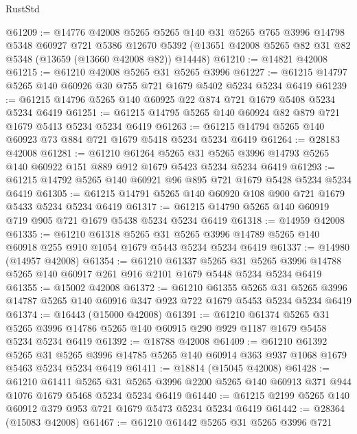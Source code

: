 \begin{lexlean}{RustStd}
\begin{coremodule}
@61209 := @14776
    @42008
    @5265
    @5265
    @140
    @31
    @5265
    @765
    @3996
    @14798
    @5348
    @60927
    @721
    @5386
    @12670
    @5392
    (@13651 @42008 @5265 @82 @31 @82 @5348 (@13659 (@13660 @42008 @82)) @14448)
@61210 := @14821 @42008
@61215 := @61210 @42008 @5265 @31 @5265 @3996
@61227 := @61215 @14797 @5265 @140 @60926 @30 @755 @721 @1679 @5402 @5234 @5234 @6419
@61239 := @61215 @14796 @5265 @140 @60925 @22 @874 @721 @1679 @5408 @5234 @5234 @6419
@61251 := @61215 @14795 @5265 @140 @60924 @82 @879 @721 @1679 @5413 @5234 @5234 @6419
@61263 := @61215 @14794 @5265 @140 @60923 @73 @884 @721 @1679 @5418 @5234 @5234 @6419
@61264 := @28183 @42008
@61281 := @61210
    @61264
    @5265
    @31
    @5265
    @3996
    @14793
    @5265
    @140
    @60922
    @151
    @889
    @912
    @1679
    @5423
    @5234
    @5234
    @6419
@61293 := @61215 @14792 @5265 @140 @60921 @96 @895 @721 @1679 @5428 @5234 @5234 @6419
@61305 := @61215 @14791 @5265 @140 @60920 @108 @900 @721 @1679 @5433 @5234 @5234 @6419
@61317 := @61215 @14790 @5265 @140 @60919 @719 @905 @721 @1679 @5438 @5234 @5234 @6419
@61318 := @14959 @42008
@61335 := @61210
    @61318
    @5265
    @31
    @5265
    @3996
    @14789
    @5265
    @140
    @60918
    @255
    @910
    @1054
    @1679
    @5443
    @5234
    @5234
    @6419
@61337 := @14980 (@14957 @42008)
@61354 := @61210
    @61337
    @5265
    @31
    @5265
    @3996
    @14788
    @5265
    @140
    @60917
    @261
    @916
    @2101
    @1679
    @5448
    @5234
    @5234
    @6419
@61355 := @15002 @42008
@61372 := @61210
    @61355
    @5265
    @31
    @5265
    @3996
    @14787
    @5265
    @140
    @60916
    @347
    @923
    @722
    @1679
    @5453
    @5234
    @5234
    @6419
@61374 := @16443 (@15000 @42008)
@61391 := @61210
    @61374
    @5265
    @31
    @5265
    @3996
    @14786
    @5265
    @140
    @60915
    @290
    @929
    @1187
    @1679
    @5458
    @5234
    @5234
    @6419
@61392 := @18788 @42008
@61409 := @61210
    @61392
    @5265
    @31
    @5265
    @3996
    @14785
    @5265
    @140
    @60914
    @363
    @937
    @1068
    @1679
    @5463
    @5234
    @5234
    @6419
@61411 := @18814 (@15045 @42008)
@61428 := @61210
    @61411
    @5265
    @31
    @5265
    @3996
    @2200
    @5265
    @140
    @60913
    @371
    @944
    @1076
    @1679
    @5468
    @5234
    @5234
    @6419
@61440 := @61215 @2199 @5265 @140 @60912 @379 @953 @721 @1679 @5473 @5234 @5234 @6419
@61442 := @28364 (@15083 @42008)
@61467 := @61210
    @61442
    @5265
    @31
    @5265
    @3996
    @721

\end{coremodule}
\end{lexlean}

